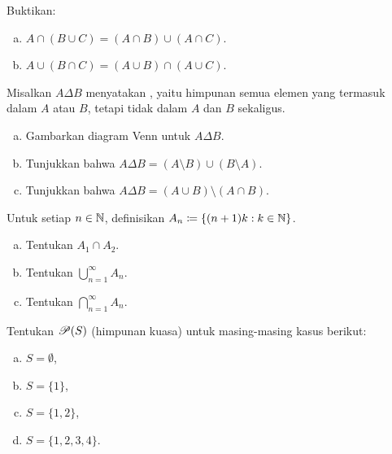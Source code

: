 \begin{exercise}
Buktikan:
\begin{enumerate}[a)]
\item $A \cap (B \cup C) = (A \cap B) \cup (A \cap C)$.
\item $A \cup (B \cap C) = (A \cup B) \cap (A \cup C)$.
\end{enumerate}
\end{exercise}

\begin{samepage}
\begin{exercise}
Misalkan $A \Delta B$ menyatakan
\emph{}, yaitu himpunan semua elemen yang
termasuk dalam $A$ atau $B$, tetapi tidak dalam $A$ dan $B$ sekaligus.
\begin{enumerate}[a)]
\item
Gambarkan diagram Venn untuk
$A \Delta B$.
\item
Tunjukkan bahwa $A \Delta B = (A \setminus B) \cup (B \setminus A)$.
\item
Tunjukkan bahwa $A \Delta B = (A \cup B) \setminus ( A \cap B)$.
\end{enumerate}
\end{exercise}
\end{samepage}

\begin{exercise}
Untuk setiap $n \in {\mathbb{N}}$, definisikan $A_n \coloneqq \{ (n+1)k : k \in {\mathbb{N}} \}$.
\begin{enumerate}[a)]
\item Tentukan $A_1 \cap A_2$.
\item Tentukan $\bigcup_{n=1}^\infty A_n$.
\item Tentukan $\bigcap_{n=1}^\infty A_n$.
\end{enumerate}
\end{exercise}

\begin{samepage}
\begin{exercise}
Tentukan ${\mathscr{P}}(S)$ (himpunan kuasa) untuk masing-masing kasus berikut:
\begin{enumerate}[a)]
\item $S = \emptyset$,
\item $S = \{1\}$,
\item $S = \{1,2\}$,
\item $S = \{1,2,3,4\}$.
\end{enumerate}
\end{exercise}
\end{samepage}


